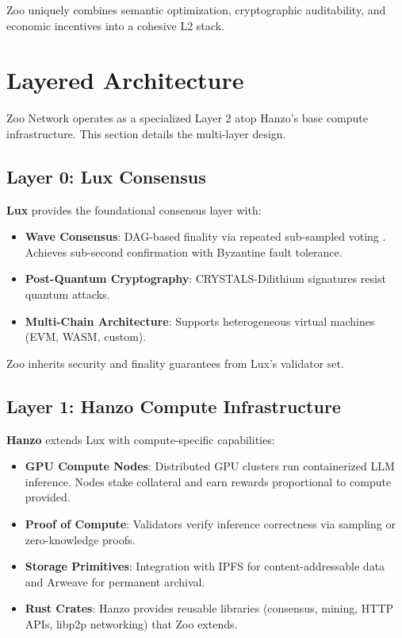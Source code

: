 \documentclass[11pt,a4paper]{article}
\begin{document}
Zoo uniquely combines semantic optimization, cryptographic auditability, and economic incentives into a cohesive L2 stack.

\section{Layered Architecture}

Zoo Network operates as a specialized Layer 2 atop Hanzo's base compute infrastructure. This section details the multi-layer design.

\subsection{Layer 0: Lux Consensus}

\textbf{Lux} \cite{lux2025whitepaper} provides the foundational consensus layer with:

\begin{itemize}[leftmargin=*]
\item \textbf{Wave Consensus}: DAG-based finality via repeated sub-sampled voting \cite{rocket2020snowman}. Achieves sub-second confirmation with Byzantine fault tolerance.
\item \textbf{Post-Quantum Cryptography}: CRYSTALS-Dilithium signatures resist quantum attacks.
\item \textbf{Multi-Chain Architecture}: Supports heterogeneous virtual machines (EVM, WASM, custom).
\end{itemize}

Zoo inherits security and finality guarantees from Lux's validator set.

\subsection{Layer 1: Hanzo Compute Infrastructure}

\textbf{Hanzo} \cite{hanzo2025paper} extends Lux with compute-specific capabilities:

\begin{itemize}[leftmargin=*]
\item \textbf{GPU Compute Nodes}: Distributed GPU clusters run containerized LLM inference. Nodes stake collateral and earn rewards proportional to compute provided.
\item \textbf{Proof of Compute}: Validators verify inference correctness via sampling or zero-knowledge proofs.
\item \textbf{Storage Primitives}: Integration with IPFS for content-addressable data and Arweave for permanent archival.
\item \textbf{Rust Crates}: Hanzo provides reusable libraries (consensus, mining, HTTP APIs, libp2p networking) that Zoo extends.
\end{itemize}
\end{document}
